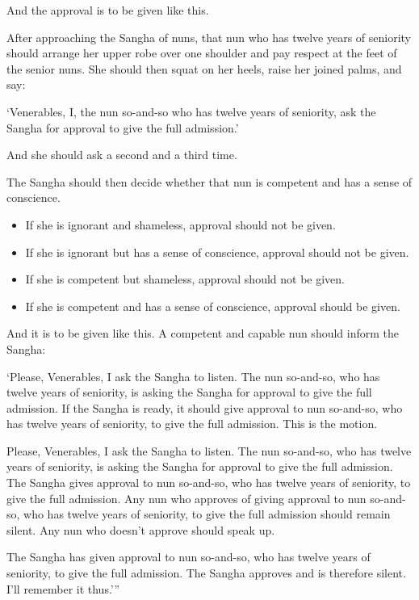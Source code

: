 \documentclass[12pt,openany]{book}%
\begin{document}
And the approval is to be given like this. 

After approaching the Sangha of nuns, that nun who has twelve years of seniority should arrange her upper robe over one shoulder and pay respect at the feet of the senior nuns. She should then squat on her heels, raise her joined palms, and say: 

‘Venerables, I, the nun so-and-so who has twelve years of seniority, ask the Sangha for approval to give the full admission.’ 

And she should ask a second and a third time. 

The Sangha should then decide whether that nun is competent and has a sense of conscience. 

\begin{itemize}%
\item If she is ignorant and shameless, approval should not be given. %
\item If she is ignorant but has a sense of conscience, approval should not be given. %
\item If she is competent but shameless, approval should not be given. %
\item If she is competent and has a sense of conscience, approval should be given. %
\end{itemize}

And it is to be given like this. A competent and capable nun should inform the Sangha: 

‘Please, Venerables, I ask the Sangha to listen. The nun so-and-so, who has twelve years of seniority, is asking the Sangha for approval to give the full admission. If the Sangha is ready, it should give approval to nun so-and-so, who has twelve years of seniority, to give the full admission. This is the motion. 

Please, Venerables, I ask the Sangha to listen. The nun so-and-so, who has twelve years of seniority, is asking the Sangha for approval to give the full admission. The Sangha gives approval to nun so-and-so, who has twelve years of seniority, to give the full admission. Any nun who approves of giving approval to nun so-and-so, who has twelve years of seniority, to give the full admission should remain silent. Any nun who doesn’t approve should speak up. 

The Sangha has given approval to nun so-and-so, who has twelve years of seniority, to give the full admission. The Sangha approves and is therefore silent. I’ll remember it thus.’” 
\end{document}
